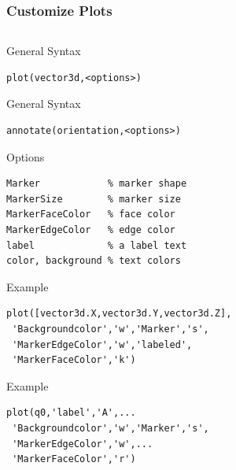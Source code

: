 \documentclass[compress]{beamer}
\begin{document}
\begin{frame}[fragile]
  \frametitle{Customize Plots}

\begin{columns}
  \begin{column}{8.5cm}

\begin{overprint}
  General Syntax%
\begin{lstlisting}[style=input]
plot(vector3d,<options>)
\end{lstlisting}
  General Syntax
\begin{lstlisting}[style=input]
annotate(orientation,<options>)
\end{lstlisting}
\end{overprint}

Options
\begin{lstlisting}[style=input]
Marker            % marker shape
MarkerSize        % marker size
MarkerFaceColor   % face color
MarkerEdgeColor   % edge color
label             % a label text
color, background % text colors
\end{lstlisting}

\begin{overprint}
  Example
\begin{lstlisting}[style=input]
plot([vector3d.X,vector3d.Y,vector3d.Z],
 'Backgroundcolor','w','Marker','s',
 'MarkerEdgeColor','w','labeled',
 'MarkerFaceColor','k')
\end{lstlisting}

Example
\begin{lstlisting}[style=input]
plot(q0,'label','A',...
 'Backgroundcolor','w','Marker','s',
 'MarkerEdgeColor','w',...
 'MarkerFaceColor','r')
\end{lstlisting}

\end{overprint}

\end{column}


\end{columns}
\end{frame}
\end{document}
